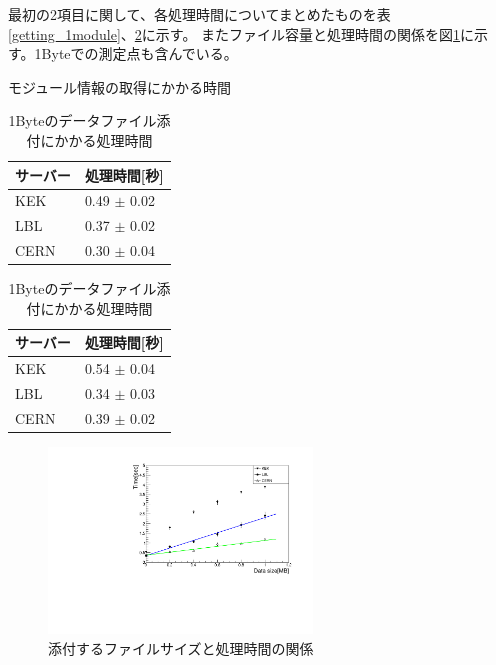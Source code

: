 最初の2項目に関して、各処理時間についてまとめたものを表\ref{getting_1module}、\ref{sendpd_1byte}に示す。
またファイル容量と処理時間の関係を図\ref{datasize_vs_time}に示す。1Byteでの測定点も含んでいる。

\begin{table}[tbp]
  \begin{minipage}[t]{.45\textwidth}
  \begin{center}
  \caption[モジュール情報の取得にかかる時間]{モジュール情報の取得にかかる時間}
  \label{getting_1module}
    \begin{tabular}{|ll|} \hline
      サーバー & 処理時間[秒] \\ \hline
      KEK & 0.49 $\pm$ 0.02 \\ 
      LBL & 0.37 $\pm$ 0.02 \\ 
      CERN & 0.30 $\pm$ 0.04 \\ \hline 
    \end{tabular}
  \end{center}
  \end{minipage}
  \hfill 
  \begin{minipage}[t]{.45\textwidth}
  \begin{center}
  \caption[1Byteのデータファイル添付にかかる処理時間]{1Byteのデータファイル添付にかかる処理時間}
  \label{sendpd_1byte}
    \begin{tabular}{|ll|} \hline
      サーバー & 処理時間[秒] \\ \hline
      KEK & 0.54 $\pm$ 0.04 \\ 
      LBL & 0.34 $\pm$ 0.03 \\ 
      CERN & 0.39 $\pm$ 0.02 \\ \hline 
    \end{tabular}
  \end{center}
  \end{minipage}
\end{table}

\begin{figure}[bpt]\centering
\includegraphics[width=7cm,angle=270]{datasize_vs_time.pdf}
\caption[添付するファイルサイズと処理時間の関係]{添付するファイルサイズと処理時間の関係}
\label{datasize_vs_time}
\end{figure}

